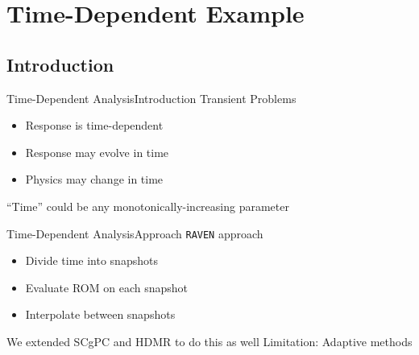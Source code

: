 \documentclass{beamer}
\newcommand{\raven}{\texttt{RAVEN}}
\begin{document}
\section{Time-Dependent Example}
\subsection{Introduction}
\begin{frame}{Time-Dependent Analysis}{Introduction}\vspace{-20pt}
  \vfill
  Transient Problems
  \vfill
  \begin{itemize}
    \item Response is time-dependent
  \vfill
    \item Response may evolve in time
  \vfill
    \item Physics may change in time
  \end{itemize}
  \vfill
  ``Time'' could be any monotonically-increasing parameter
  \vfill
\end{frame}

\begin{frame}{Time-Dependent Analysis}{Approach}\vspace{-20pt}
  \vfill
  \raven{} approach
  \vfill
  \begin{itemize}
    \item Divide time into snapshots
  \vfill
    \item Evaluate ROM on each snapshot
  \vfill
    \item Interpolate between snapshots
  \end{itemize}
  \vfill
  We extended SCgPC and HDMR to do this as well
  \vfill
  Limitation: Adaptive methods
  \vfill
\end{frame}
\end{document}
